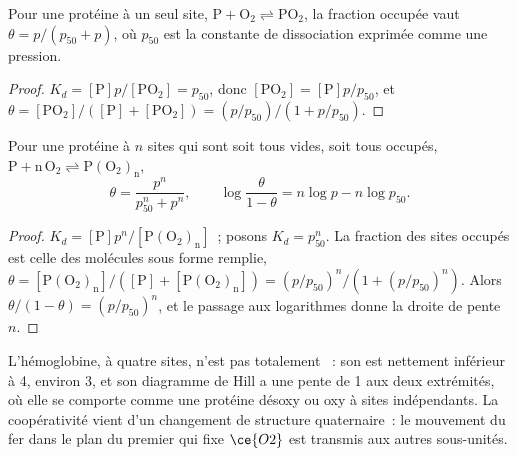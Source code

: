 \begin{proposition}\label{prop:b3:bioinorganic:hyperbola}
Pour une protéine à un seul site, $\mathrm{P + O_2 \rightleftharpoons PO_2}$, la fraction occupée vaut $\theta = p/(p_{50} + p)$, où $p_{50}$ est
la constante de dissociation exprimée comme une pression.
\end{proposition}

\begin{proof}
$K_d = [\mathrm P]p/[\mathrm{PO_2}] = p_{50}$, donc $[\mathrm{PO_2}] = [\mathrm P]p/p_{50}$, et $\theta = [\mathrm{PO_2}]/([\mathrm P] + [\mathrm{PO_2}]) = (p/p_{50})/(1 + p/p_{50})$.
\end{proof}

\begin{theorem}\label{thm:b3:bioinorganic:hill}
Pour une protéine à $n$ sites qui sont soit tous vides, soit tous occupés,
$\mathrm{P + n\,O_2 \rightleftharpoons P(O_2)_n}$,
\[
  \theta = \frac{p^n}{p_{50}^n + p^n}, \qquad \log\frac{\theta}{1 - \theta} = n\log p - n\log p_{50}.
\]
\end{theorem}

\begin{proof}
$K_d = [\mathrm P]p^n/[\mathrm{P(O_2)_n}]$~; posons $K_d = p_{50}^n$. La fraction des sites occupés est celle des molécules
sous forme remplie, $\theta = [\mathrm{P(O_2)_n}]/([\mathrm P] + [\mathrm{P(O_2)_n}]) = (p/p_{50})^n/(1 + (p/p_{50})^n)$. Alors $\theta/(1 - \theta) = (p/p_{50})^n$, et le passage
aux logarithmes donne la droite de pente $n$.
\end{proof}

L'hémoglobine, à quatre sites, n'est pas totalement ~: son
 est nettement inférieur à 4, environ 3, et son
diagramme de Hill a une pente de 1 aux deux extrémités, où elle se comporte
comme une protéine désoxy ou oxy à sites indépendants. La coopérativité
vient d'un changement de structure quaternaire~: le mouvement du fer dans
le plan du premier  qui fixe $\ce{O2}$ est transmis aux autres sous-unités.

